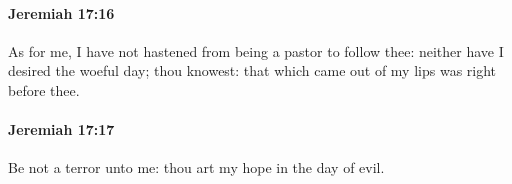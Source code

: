 		\paragraph{Jeremiah 17:16} %
			\label{JEREMIAH-17-16}

			As for me, I have not hastened from being a pastor to follow thee: neither have I desired the woeful day; thou knowest: that which came out of my lips was right before thee.


		\paragraph{Jeremiah 17:17} %
			\label{JEREMIAH-17-17}

			Be not a terror unto me: thou art my hope in the day of evil.


